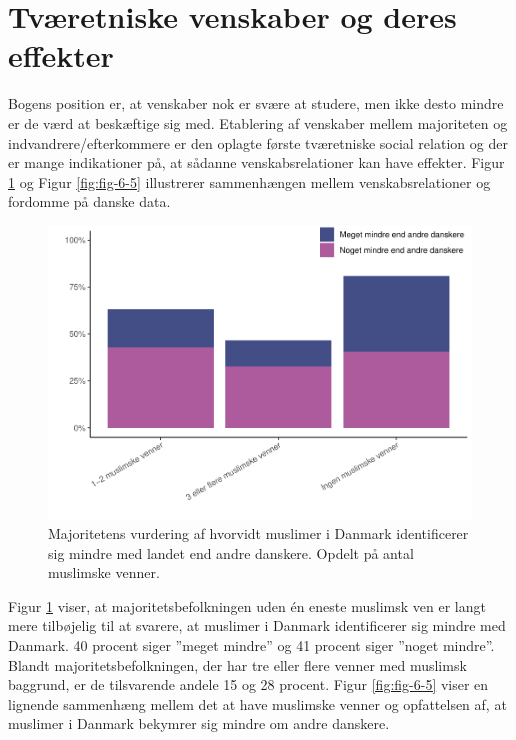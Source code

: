\documentclass[
]{book}
\begin{document}
\section{Tværetniske venskaber og deres effekter}\label{tvuxe6retniske-venskaber-og-deres-effekter}

Bogens position er, at venskaber nok er svære at studere, men ikke desto mindre er de værd at beskæftige sig med. Etablering af venskaber mellem majoriteten og indvandrere/efterkommere er den oplagte første tværetniske social relation og der er mange indikationer på, at sådanne venskabsrelationer kan have effekter. Figur \ref{fig:fig-6-4} og Figur \ref{fig:fig-6-5} illustrerer sammenhængen mellem venskabsrelationer og fordomme på danske data.

\begin{figure}
\includegraphics[width=1\linewidth]{en-befolkning-blander-sig_files/figure-latex/fig-6-4-1} \caption{Majoritetens vurdering af hvorvidt muslimer i Danmark identificerer sig mindre med landet end andre danskere. Opdelt på antal muslimske venner.}\label{fig:fig-6-4}
\end{figure}

Figur \ref{fig:fig-6-4} viser, at majoritetsbefolkningen uden én eneste muslimsk ven er langt mere tilbøjelig til at svarere, at muslimer i Danmark identificerer sig mindre med Danmark. 40 procent siger ''meget mindre'' og 41 procent siger ''noget mindre''. Blandt majoritetsbefolkningen, der har tre eller flere venner med muslimsk baggrund, er de tilsvarende andele 15 og 28 procent. Figur \ref{fig:fig-6-5} viser en lignende sammenhæng mellem det at have muslimske venner og opfattelsen af, at muslimer i Danmark bekymrer sig mindre om andre danskere.
\end{document}

